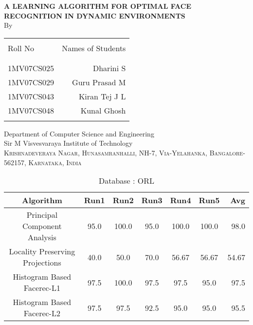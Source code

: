 \documentclass[10pt,a4paper]{article}
\begin{document}
\begin{center}



\uppercase{\Large \textbf {A Learning Algorithm for Optimal Face Recognition in Dynamic Environments}}\\[3.0cm]

\vspace{1.0cm}
\normalsize By \\
\begin{table}[h]
\centering
\begin{tabular}{lr}\hline \\
Roll No & Names of Students \\ \\ \hline
\\
1MV07CS025 & Dharini S \\
1MV07CS029 & Guru Prasad M \\
1MV07CS043 & Kiran Tej J L \\
1MV07CS048 & Kunal Ghosh \\ \\ \hline 
\end{tabular}
\end{table}

\vfill

\normalsize

\Large{Department of Computer Science and Engineering}\\
\LARGE{Sir M Visvesvaraya Institute of Technology }\\
\normalsize
\textsc{Krishnadeveraya Nagar, Hunasamranhalli, NH-7,
Via-Yelahanka, Bangalore-562157, Karnataka, India}\\

\vspace{0.5cm}

\newpage

\begin{table}
\caption{Database : ORL}
\centering
\begin{tabular}{| c | c | c | c | c | c | r | } \hline 
Algorithm & Run1 & Run2 & Run3 & Run4 & Run5 & Avg  \\  
\hline
Principal Component Analysis & 95.0 & 100.0 & 95.0 & 100.0 & 100.0 & 98.0 \\
\hline
Locality Preserving Projections & 40.0 & 50.0 & 70.0 & 56.67 & 56.67 & 54.67 \\
\hline
Histogram Based Facerec-L1 & 97.5 & 100.0 & 97.5 & 97.5 & 95.0 & 97.5 \\
\hline
Histogram Based Facerec-L2 & 97.5 & 97.5 & 92.5 & 95.0 & 95.0 & 95.5 \\
\hline
\end{tabular}
\end{table}



\end{center}
\end{document}
